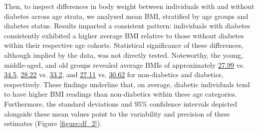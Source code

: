 \documentclass[11pt]{article}
\begin{document}
Then, to inspect differences in body weight between individuals with and without diabetes across age strata, we analyzed mean BMI, stratified by age groups and diabetes status. Results imparted a consistent pattern: individuals with diabetes consistently exhibited a higher average BMI relative to those without diabetes within their respective age cohorts. Statistical significance of these differences, although implied by the data, was not directly tested. Noteworthy, the young, middle-aged, and old groups revealed average BMIs of approximately \hyperlink{B0a}{27.99} vs. \hyperlink{B1a}{34.5}, \hyperlink{B2a}{28.22} vs. \hyperlink{B3a}{33.2}, and \hyperlink{B4a}{27.11} vs. \hyperlink{B5a}{30.62} for non-diabetics and diabetics, respectively. These findings underline that, on average, diabetic individuals tend to have higher BMI readings than non-diabetics within these age categories. Furthermore, the standard deviations and 95\% confidence intervals depicted alongside these mean values point to the variability and precision of these estimates (Figure \ref{figure:df_2}).

\end{document}
